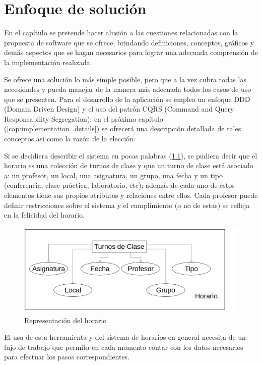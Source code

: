 \chapter{Enfoque de solución}

En el capítulo se pretende hacer alusión a las cuestiones relacionadas con la propuesta de software que se ofrece, brindando definiciones, conceptos, gráficos y demás aspectos que se hagan necesarios para lograr una adecuada comprensión de la implementación realizada.

Se ofrece una solución lo más simple posible, pero que a la vez cubra todas las necesidades y pueda manejar de la manera más adecuada todos los casos de uso que se presenten. Para el desarrollo de la aplicación se emplea un enfoque DDD (Domain Driven Design) y el uso del patrón CQRS (Command and Query Responsability Segregation); en el próximo capítulo (\ref{cap:implementation_details}) se ofrecerá una descripción detallada de tales conceptos así como la razón de la elección.

Si se decidiera describir el sistema en pocas palabras (\ref{fig:horario}), se pudiera decir que el horario es una colección de turnos de clase y que un turno de clase está asociado a: un profesor, un local, una asignatura, un grupo, una fecha y un tipo (conferencia, clase práctica, laboratorio, etc); además de cada uno de estos elementos tiene sus propios atributos y relaciones entre ellos. Cada profesor puede definir restricciones sobre el sistema y el cumplimiento (o no de estas) se refleja en la felicidad del horario.

\begin{figure}[h!]
	\centering
	\includegraphics[width=1\linewidth]{images/Chapter 2/horario}
	\caption{Representación del horario}
	\label{fig:horario}
\end{figure}

El usa de esta herramienta y del sistema de horarios en general necesita de un fujo de trabajo que permita en cada momento contar con los datos necesarios para efectuar los pasos correspondientes.

